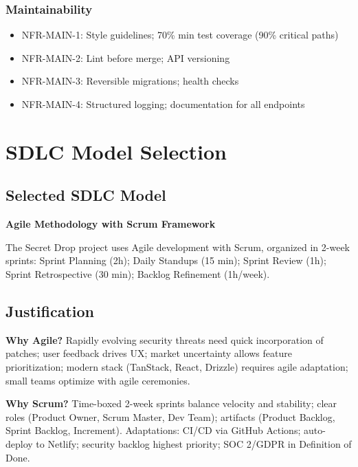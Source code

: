 \documentclass[12pt,a4paper]{article}
\begin{document}
\subsubsection{Maintainability}
\begin{itemize}[leftmargin=*, itemsep=0.1em]
  \item NFR-MAIN-1: Style guidelines; 70\% min test coverage (90\% critical paths)
  \item NFR-MAIN-2: Lint before merge; API versioning
  \item NFR-MAIN-3: Reversible migrations; health checks
  \item NFR-MAIN-4: Structured logging; documentation for all endpoints
\end{itemize}

\section{SDLC Model Selection}

\subsection{Selected SDLC Model}

\textbf{Agile Methodology with Scrum Framework}

The Secret Drop project uses Agile development with Scrum, organized in 2-week sprints: Sprint Planning (2h); Daily Standups (15 min); Sprint Review (1h); Sprint Retrospective (30 min); Backlog Refinement (1h/week).

\subsection{Justification}

\textbf{Why Agile?} Rapidly evolving security threats need quick incorporation of patches; user feedback drives UX; market uncertainty allows feature prioritization; modern stack (TanStack, React, Drizzle) requires agile adaptation; small teams optimize with agile ceremonies.

\textbf{Why Scrum?} Time-boxed 2-week sprints balance velocity and stability; clear roles (Product Owner, Scrum Master, Dev Team); artifacts (Product Backlog, Sprint Backlog, Increment). Adaptations: CI/CD via GitHub Actions; auto-deploy to Netlify; security backlog highest priority; SOC 2/GDPR in Definition of Done.
\end{document}
